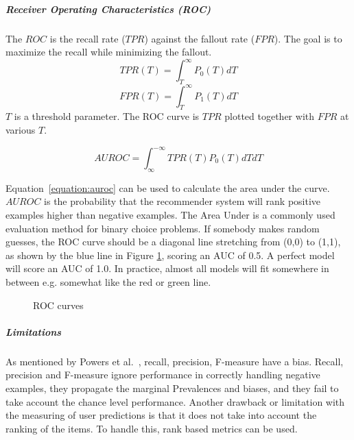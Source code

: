 \subparagraph{Receiver Operating Characteristics (ROC)}
The $ROC$ is the recall rate ($TPR$) against the fallout rate ($FPR$).
The goal is to maximize the recall while minimizing the fallout.
\begin{equation}
    TPR(T) = \int_T^\infty P_0(T)dT
    \label{equation:tpr}
\end{equation}
\begin{equation}
    FPR(T) = \int_T^\infty P_1(T)dT
    \label{equation:fpr}
\end{equation}
$T$ is a threshold parameter.
The ROC curve is $TPR$ plotted together with $FPR$ at various $T$.

\begin{equation}
    AUROC = \int_\infty^{-\infty} TPR(T)P_0(T)dTdT
    \label{equation:auroc}
\end{equation}

Equation~\ref{equation:auroc} can be used to calculate the area under the
curve.  $AUROC$ is the probability that the recommender system will rank
positive examples higher than negative examples.  The Area Under is a commonly
used evaluation method for binary choice problems. If somebody makes random
guesses, the ROC curve should be a diagonal line stretching from (0,0) to
(1,1), as shown by the blue line in Figure \ref{fig:aucroc}, scoring an AUC of
0.5. A perfect model will score an AUC of 1.0. In practice, almost all models
will fit somewhere in between e.g. somewhat like the red or green line.

\begin{figure}[H]
\label{fig:aucroc}
  \centering
    \caption{ROC curves}
\end{figure}

\subparagraph{Limitations}
\label{subp:limitations}
As mentioned by Powers et al.~\cite{powers2007}, recall, precision, F-measure
have a bias.  Recall, precision and F-measure ignore performance in correctly
handling negative examples, they propagate the marginal Prevalences and biases,
and they fail to take account the chance level performance.  Another drawback
or limitation with the measuring of user predictions is that it does not take
into account the ranking of the items. To handle this, rank based metrics can
be used.

